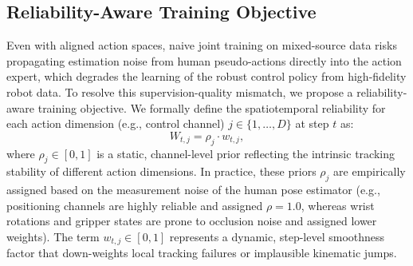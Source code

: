 \documentclass{llmxive}
\begin{document}


\subsection{Reliability-Aware Training Objective}
\label{sec:reliability-aware-objective}

Even with aligned action spaces, naive joint training on mixed-source data risks propagating estimation noise from human pseudo-actions directly into the action expert, which degrades the learning of the robust control policy from high-fidelity robot data. To resolve this supervision-quality mismatch, we propose a reliability-aware training objective. 
We formally define the spatiotemporal reliability for each action dimension (e.g., control channel) \(j \in \{1, \dots, D\}\) at step \(t\) as:
\begin{equation}
W_{t,j} = \rho_j \cdot w_{t,j},
\label{eq:reliability}
\end{equation}
where \(\rho_j \in [0, 1]\) is a static, channel-level prior reflecting the intrinsic tracking stability of different action dimensions. In practice, these priors \(\rho_j\) are empirically assigned based on the measurement noise of the human pose estimator (e.g., positioning channels are highly reliable and assigned \(\rho=1.0\), whereas wrist rotations and gripper states are prone to occlusion noise and assigned lower weights). The term \(w_{t,j} \in [0, 1]\) represents a dynamic, step-level smoothness factor that down-weights local tracking failures or implausible kinematic jumps. 
\end{document}
